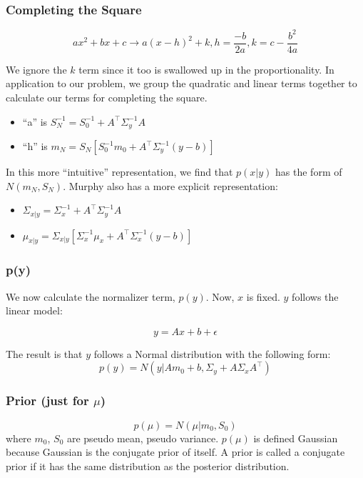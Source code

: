 \documentclass{article}
\begin{document}
\subsubsection{Completing the Square}

$$ax^2 + bx + c \to a(x - h)^2 + k, h = \frac{-b}{2a}, k = c - \frac{b^2}{4a}$$

We ignore the $k$ term since it too is swallowed up in the proportionality. In application to our problem, we group the quadratic and linear terms together to calculate our terms for completing the square.

\begin{itemize}
\item ``a'' is $S_N^{-1} = S_0^{-1} + A^\top \Sigma_y^{-1}A$
\item ``h'' is $m_N = S_N \left[S_0^{-1}m_0 + A^\top \Sigma_y^{-1}(y - b)\right]$
\end{itemize}

In this more ``intuitive'' representation, we find that $p(x|y)$ has the form of $N(m_N, S_N)$. Murphy also has a more explicit representation:

\begin{itemize}
\item $\Sigma_{x|y} = \Sigma_x^{-1} + A^\top \Sigma_y^{-1}A$
\item $\mu_{x|y} = \Sigma_{x|y} [\Sigma_x^{-1} \mu_x + A^\top \Sigma_x^{-1}(y - b)]$
\end{itemize}

\subsubsection{p(y)}

We now calculate the normalizer term, $p(y)$. Now, $x$ is fixed. $y$ follows the linear model:

$$y = Ax + b + \epsilon$$

The result is that $y$ follows a Normal distribution with the following form:
$$p(y) = N(y|Am_0 + b, \Sigma_y + A \Sigma_x A^\top)$$

\subsubsection{Prior (just for $\mu$)}
$$p(\mu) = N(\mu|m_0,S_0)$$
where $m_0$, $S_0$ are pseudo mean, pseudo variance. $p(\mu)$ is defined Gaussian because Gaussian is the conjugate prior of itself. A prior is called a conjugate prior if it has the same distribution as the posterior distribution.
\end{document}

